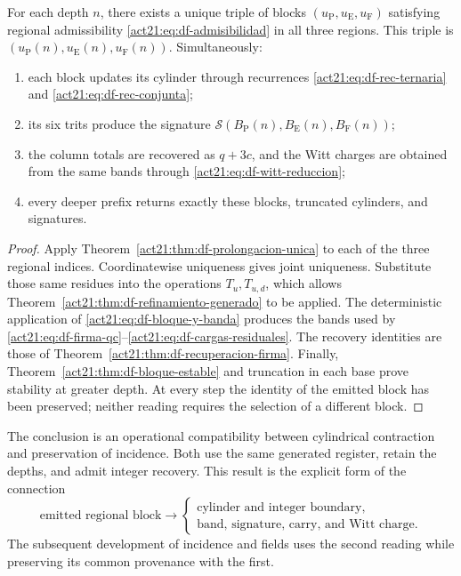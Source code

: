 \begin{theorem}
\label{act21:thm:df-composicion-conjunta}
For each depth \(n\), there exists a unique triple of blocks
\((u_{\mathrm P},u_{\mathrm E},u_{\mathrm F})\) satisfying regional
admissibility \eqref{act21:eq:df-admisibilidad} in all three regions.
This triple is \((u_{\mathrm P}(n),u_{\mathrm E}(n),u_{\mathrm F}(n))\).
Simultaneously:
\begin{enumerate}
\item each block updates its cylinder through recurrences
\eqref{act21:eq:df-rec-ternaria} and \eqref{act21:eq:df-rec-conjunta};
\item its six trits produce the signature
\(\mathcal S(B_{\mathrm P}(n),B_{\mathrm E}(n),B_{\mathrm F}(n))\);
\item the column totals are recovered as \(q+3c\), and the Witt charges
are obtained from the same bands through
\eqref{act21:eq:df-witt-reduccion};
\item every deeper prefix returns exactly these blocks, truncated
cylinders, and signatures.
\end{enumerate}
\end{theorem}

\begin{proof}
Apply Theorem~\ref{act21:thm:df-prolongacion-unica} to each of the three
regional indices. Coordinatewise uniqueness gives joint uniqueness.
Substitute those same residues into the operations \(T_u,T_{u,d}\),
which allows Theorem~\ref{act21:thm:df-refinamiento-generado} to be applied.
The deterministic application of \eqref{act21:eq:df-bloque-y-banda} produces
the bands used by
\eqref{act21:eq:df-firma-qc}--\eqref{act21:eq:df-cargas-residuales}. The recovery
identities are those of Theorem~\ref{act21:thm:df-recuperacion-firma}.
Finally, Theorem~\ref{act21:thm:df-bloque-estable} and truncation in each base
prove stability at greater depth. At every step the identity of the
emitted block has been preserved; neither reading requires the selection
of a different block.
\end{proof}

The conclusion is an operational compatibility between cylindrical
contraction and preservation of incidence. Both use the same generated
register, retain the depths, and admit integer recovery. This result
is the explicit form of the connection
\[
 \text{emitted regional block}
 \longrightarrow
 \begin{cases}
 \text{cylinder and integer boundary},\\
 \text{band, signature, carry, and Witt charge}.
 \end{cases}
\]
The subsequent development of incidence and fields uses the second
reading while preserving its common provenance with the first.
